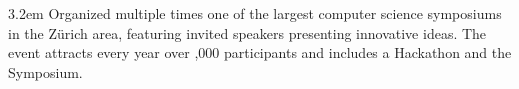 \begin{datetabular}{3.2em}
{Organized multiple times one of the largest computer science symposiums in the Zürich area, featuring invited speakers presenting innovative ideas. The event attracts every year over {,000} participants and includes a Hackathon and the Symposium.
}




























\end{datetabular}
